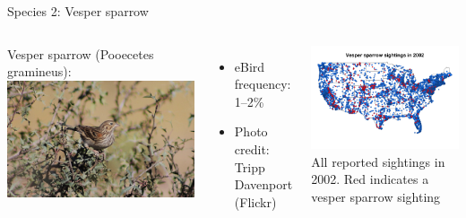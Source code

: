\documentclass{beamer}
\begin{document}
\begin{frame}{Species 2: Vesper sparrow}
\begin{columns}[c]
  Vesper sparrow (Pooecetes gramineus): \vspace{0.5em}
  \includegraphics[width=1\linewidth]{./plots/vesper_sparrow.jpg}
  \begin{itemize} \setlength{\itemsep}{0.5em}
    \item eBird frequency: 1--2\%
    \item \alert{Photo credit}: Tripp Davenport (Flickr)
  \end{itemize}

  \includegraphics[width=1\linewidth]{./plots/vesper_sparrow.png}\\
  All reported sightings in 2002. \alert{Red} indicates a vesper sparrow sighting
\end{columns}
\end{frame}
\end{document}
